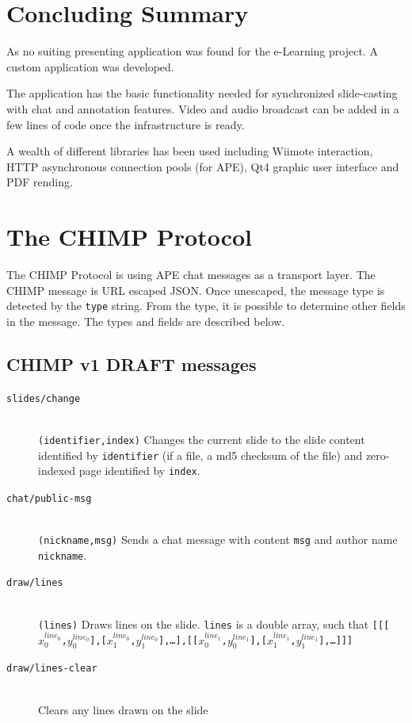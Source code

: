\documentclass[a4paper,12pt]{article}
\newcommand{\ditem}[1]{\item[\texttt{{#1}}] \hfill \\}
\begin{document}
\section{Concluding Summary}
As no suiting presenting application was found for the e-Learning project. A custom application was developed.

The application has the basic functionality needed for synchronized slide-casting with chat and annotation features. Video and audio broadcast can be added in a few lines of code once the infrastructure is ready. 

A wealth of different libraries has been used including Wiimote interaction, HTTP asynchronous connection pools (for APE), Qt4 graphic user interface and PDF rending.


\appendix
\newpage

\section{The CHIMP Protocol}
\label{chimpproto}
The CHIMP Protocol is using APE chat messages as a transport layer. The CHIMP message is URL escaped JSON. Once unescaped, the message type is detected by the \texttt{type} string. From the type, it is possible to determine other fields in the message. The types and fields are described below.

\subsection{CHIMP v1 DRAFT messages}

\begin{description}
\ditem{slides/change}
\texttt{(identifier,index)} Changes the current slide to the slide content identified by \texttt{identifier} (if a file, a md5 checksum of the file) and zero-indexed page identified by \texttt{index}.

\ditem{chat/public-msg}
\texttt{(nickname,msg)} Sends a chat message with content \texttt{msg} and author name \texttt{nickname}.

\ditem{draw/lines}
\texttt{(lines)} Draws lines on the slide. \texttt{lines} is a double array, such that \texttt{[[[$x_0^{line_0}$,$y_0^{line_0}$],[$x_1^{line_0}$,$y_1^{line_0}$],\ldots],[[$x_0^{line_1}$,$y_0^{line_1}$],[$x_1^{line_1}$,$y_1^{line_1}$],\ldots]]]}

\ditem{draw/lines-clear}
Clears any lines drawn on the slide
\end{description}
\end{document}
